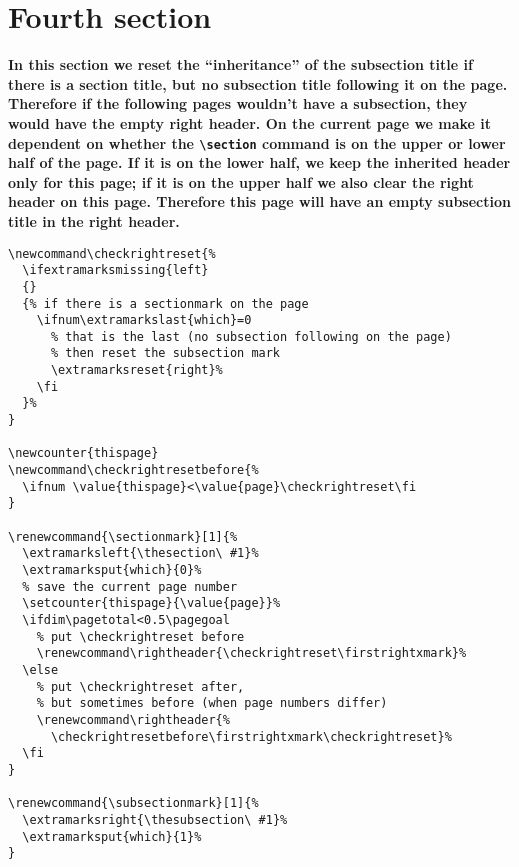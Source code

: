 \documentclass{article}
\renewcommand{\sectionmark}[1]{%
    \markboth{\thesection. #1}{}}
\renewcommand{\subsectionmark}[1]{%
    \markright{\thesubsection. #1}}
\begin{document}
\renewcommand{\subsectionmark}[1]{%
  \InsertMark{subsection}{\thesubsection. #1}%
  \InsertMark{which}{1}%
}

\section{Fourth section}
\label{sec:missing}

{\bfseries In this section we reset the ``inheritance'' of the subsection title if there is a section title, but no subsection title following it on the page. Therefore if the following pages wouldn't have a subsection, they would have the empty right header. On the current page we make it dependent on whether the \verb|\section| command is on the upper or lower half of the page. If it is on the lower half, we keep the inherited header only for this page; if it is on the upper half we also clear the right header on this page. Therefore this page will have an empty subsection title in the right header.}

\begin{verbatim}
\newcommand\checkrightreset{%
  \ifextramarksmissing{left}
  {}
  {% if there is a sectionmark on the page
    \ifnum\extramarkslast{which}=0
      % that is the last (no subsection following on the page)
      % then reset the subsection mark
      \extramarksreset{right}%
    \fi
  }%
}

\newcounter{thispage}
\newcommand\checkrightresetbefore{% 
  \ifnum \value{thispage}<\value{page}\checkrightreset\fi
}

\renewcommand{\sectionmark}[1]{%
  \extramarksleft{\thesection\ #1}%
  \extramarksput{which}{0}%
  % save the current page number
  \setcounter{thispage}{\value{page}}%
  \ifdim\pagetotal<0.5\pagegoal
    % put \checkrightreset before
    \renewcommand\rightheader{\checkrightreset\firstrightxmark}%
  \else
    % put \checkrightreset after,
    % but sometimes before (when page numbers differ)
    \renewcommand\rightheader{%
      \checkrightresetbefore\firstrightxmark\checkrightreset}%
  \fi
}

\renewcommand{\subsectionmark}[1]{%
  \extramarksright{\thesubsection\ #1}%
  \extramarksput{which}{1}%
}
\end{verbatim}

\medskip

\lipsum[1-3]
\end{document}
